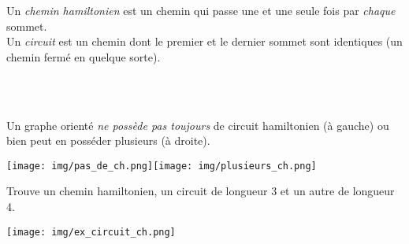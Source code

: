 \documentclass[a4paper,12pt]{book}
\begin{document}
\begin{exemple}[]
\end{exemple}

\begin{definition}

Un \textit{chemin hamiltonien} est un chemin qui passe une et une seule fois par \textit{chaque} sommet.\\
Un \textit{circuit} est un chemin dont le premier et le dernier sommet sont identiques (un chemin \og fermé\fg{} en quelque sorte).
\end{definition}


\begin{exemple}[s]

\\

\\

\end{exemple}

\begin{remarque}[]
Un graphe orienté \textit{ne possède pas toujours} de circuit hamiltonien (à gauche) ou bien peut en posséder plusieurs (à droite).
\begin{center}
\texttt{[image: img/pas\_de\_ch.png]}\hspace{2cm}\texttt{[image: img/plusieurs\_ch.png]}
\end{center}
\end{remarque}

\begin{exercice}[]
Trouve un chemin hamiltonien, un circuit de longueur 3 et un autre de longueur 4.
\begin{center}
\texttt{[image: img/ex\_circuit\_ch.png]}
\end{center}
\end{exercice}
\end{document}
